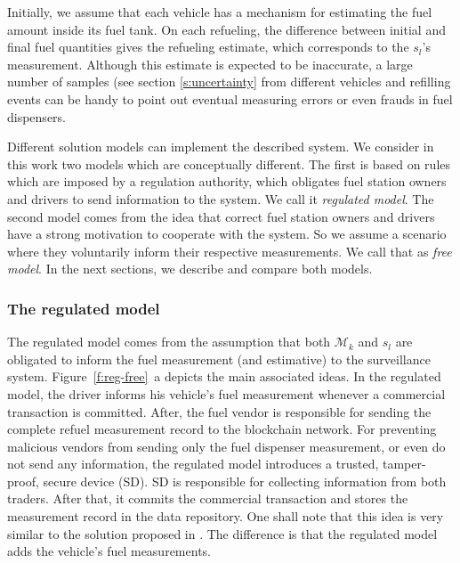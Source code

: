 \documentclass[sigplan]{acmart}
\begin{document}
Initially, we assume that each vehicle has a mechanism for estimating the fuel amount inside its fuel tank.
On each refueling, the difference between initial and final fuel quantities gives the refueling estimate, which corresponds to the $s_l$'s measurement.
Although this estimate is expected to be inaccurate, a large number of samples (see section \ref{s:uncertainty} from different vehicles and refilling events can be handy to point out eventual measuring errors or even frauds in fuel dispensers.

Different solution models can implement the described system.
We consider in this work two models which are conceptually different.
The first is based on rules which are imposed by a regulation authority, which obligates fuel station owners and drivers to send information to the system. We call it \emph{regulated model}.
The second model comes from the idea that correct fuel station owners and drivers have a strong motivation to cooperate with the system.
So we assume a scenario where they voluntarily inform their respective measurements.
We call that as \emph{free model}.
In the next sections, we describe and compare both models.

\subsubsection{The regulated model}
The regulated model comes from the assumption that both $\mathcal{M}_k$ and $s_l$ are obligated to inform the fuel measurement (and estimative) to the surveillance system.
Figure~\ref{f:reg-free}~a depicts the main associated ideas.
In the regulated model, the driver informs his vehicle's fuel measurement whenever a commercial transaction is committed.
After, the fuel vendor is responsible for sending the complete refuel measurement record to the blockchain network.
For preventing malicious vendors from sending only the fuel dispenser measurement, or even do not send any information, the regulated model introduces a trusted, tamper-proof, secure device (SD).
SD is responsible for collecting information from both traders.
After that, it commits the commercial transaction and stores the measurement record in the data repository.
One shall note that this idea is very similar to the solution proposed in \cite{Beteto2016}. 
The difference is that the regulated model adds the vehicle's fuel measurements.
\end{document}
